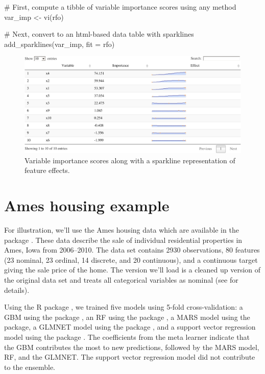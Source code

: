 \begin{Schunk}
\begin{Sinput}
# First, compute a tibble of variable importance scores using any method
var_imp <- vi(rfo)

# Next, convert to an html-based data table with sparklines
add_sparklines(var_imp, fit = rfo)
\end{Sinput}
\begin{figure}[!htb]

{\centering \includegraphics[width=1\linewidth]{greenwell-boehmke_files/figure-latex/sparklines-1} 

}

\caption[Variable importance scores along with a sparkline representation of feature effects]{Variable importance scores along with a sparkline representation of feature effects.}\label{fig:sparklines}
\end{figure}
\end{Schunk}

\section{Ames housing example}

For illustration, we'll use the Ames housing data which are available in
the  package \citep{AmesHousing-pkg}. These data
describe the sale of individual residential properties in Ames, Iowa
from 2006--2010. The data set contains 2930 observations, 80 features
(23 nominal, 23 ordinal, 14 discrete, and 20 continuous), and a
continuous target giving the sale price of the home. The version we'll
load is a cleaned up version of the original data set and treats all
categorical variables as nominal (see 
for details).

Using the R package  \citep{SuperLearner-pkg}, we
trained five models using 5-fold cross-validation: a GBM using the
 package \citep{xgboost-pkg}, an RF using the
 package \citep{ranger-pkg}, a MARS model using the
 package, a GLMNET model using the  package
\citep{glmnet-pkg}, and a support vector regression model using the
 package \citep{kernlab-pkg}. The coefficients from the
meta learner indicate that the GBM contributes the most to new
predictions, followed by the MARS model, RF, and the GLMNET. The support
vector regression model did not contribute to the ensemble.

